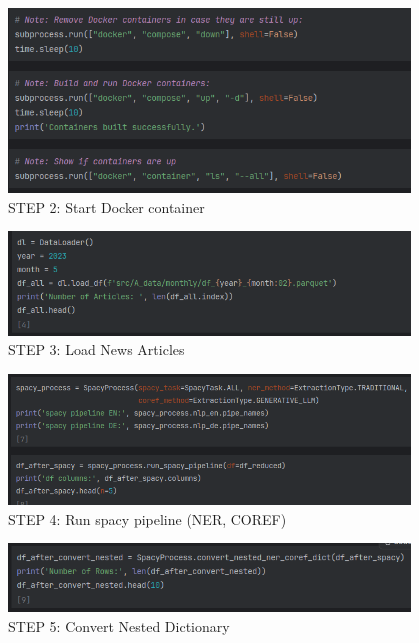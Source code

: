 \begin{figure}[H]   %
    \centering
    \includegraphics[width=0.95\textwidth]{Assets/main-2}
    \caption{STEP 2: Start Docker container}
    \label{fig:main-2}
\end{figure}
\begin{figure}[H]   %
    \centering
    \includegraphics[width=0.95\textwidth]{Assets/main-3}
    \caption{STEP 3: Load News Articles}
    \label{fig:main-3}
\end{figure}
\begin{figure}[H]   %
    \centering
    \includegraphics[width=0.95\textwidth]{Assets/main-4}
    \caption{STEP 4: Run spacy pipeline (NER, COREF)}
    \label{fig:main-4}
\end{figure}
\begin{figure}[H]   %
    \centering
    \includegraphics[width=0.95\textwidth]{Assets/main-5}
    \caption{STEP 5: Convert Nested Dictionary}
    \label{fig:main-5}
\end{figure}
